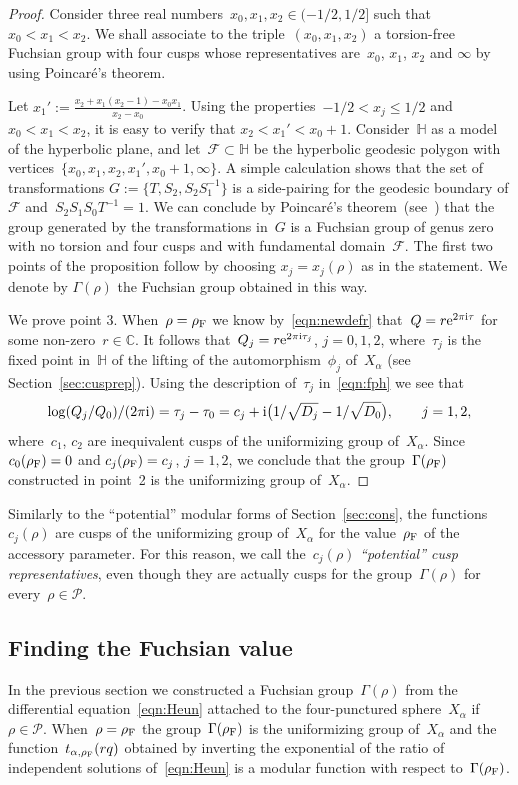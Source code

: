 \documentclass[pdftex]{sigma}
\newcommand{\C}{\mathbb{C}}
\newcommand{\Po}{\mathbb{H}}
\numberwithin{equation}{section}
\begin{document}
\begin{proof}Consider three real numbers~$x_0,x_1,x_2\in(-1/2,1/2]$ such that~$x_0<x_1<x_2$. We shall associate to the triple~$(x_0,x_1,x_2)$ a torsion-free Fuchsian group with four cusps whose representatives are~$x_0$, $x_1$, $x_2$ and $\infty$ by using Poincar\'e's theorem.

Let $x_1':=\frac{x_2+x_1(x_2-1)-x_0x_1}{x_2-x_0}$. Using the properties~$-1/2<x_j\le1/2$ and~$x_0<x_1<x_2$, it is easy to verify that $x_2<x_1'<x_0+1$.
Consider~$\Po$ as a model of the hyperbolic plane, and let~$\mathcal{F}\subset\Po$ be the hyperbolic geodesic polygon with vertices~$\{x_0,x_1,x_2,x_1',x_0+1,\infty\}$. A simple calculation shows that the set of transformations $G:=\big\{T,S_2,S_2S_1^{-1}\big\}$ is a side-pairing for the geodesic boundary of $\mathcal{F}$ and~$S_2S_1S_0T^{-1}=1$. We can conclude by Poincar\'e's theorem~(see~\cite{Beardon}) that the group generated by the transformations in~$G$ is a Fuchsian group of genus zero with no torsion and four cusps and with fundamental domain~$\mathcal{F}$.
The first two points of the proposition follow by choosing $x_j=x_j(\rho)$ as in the statement. We denote by $\Gamma(\rho)$ the Fuchsian group obtained in this way.

We prove point 3. When~$\rho=\rho_{\rm F}$ we know by~\eqref{eqn:newdefr} that~$Q=r{\rm e}^{2\pi {\rm i}\tau}$ for some non-zero~$r\in\C$.
It follows that~$Q_j=r{\rm e}^{2\pi {\rm i}\tau_j}$, $j=0,1,2$, where~$\tau_j$ is the fixed point in~$\Po$ of the lifting of the automorphism~$\phi_j$ of~$X_\alpha$ (see Section~\ref{sec:cusprep}). Using the description of~$\tau_j$ in~\eqref{eqn:fph} we see that
\[
\log(Q_j/Q_0)/(2\pi {\rm i}) = \tau_j -\tau_0 = {c}_j +{\rm i}\big(1/\sqrt{D_j}-1/\sqrt{D_0}\big),\qquad j=1,2,
\]
where~$c_1$, $c_2$ are inequivalent cusps of the uniformizing group of~$X_\alpha$. Since~$c_0(\rho_{\rm F})=0$ and $c_j(\rho_{\rm F})=c_j$, $j=1,2$, we conclude that the group~$\Gamma(\rho_{\rm F})$ constructed in point~2 is the uniformizing group of~$X_\alpha$.
\end{proof}

Similarly to the ``potential'' modular forms of Section~\ref{sec:cons}, the functions~$c_j(\rho)$ are cusps of the uniformizing group of~$X_\alpha$ for the value~$\rho_{\rm F}$ of the accessory parameter. For this reason, we call the~$c_j(\rho)$ \emph{``potential'' cusp representatives}, even though they are actually cusps for the group~$\Gamma(\rho)$ for every~$\rho\in\mathcal{P}$.

\subsection{Finding the Fuchsian value}\label{sec:findfin}
In the previous section we constructed a Fuchsian group~$\Gamma(\rho)$ from the differential equation~\eqref{eqn:Heun} attached to the four-punctured sphere~$X_\alpha$ if~$\rho\in\mathcal{P}$. When~$\rho=\rho_{\rm F}$ the group~$\Gamma(\rho_{\rm F})$ is the uniformizing group of~$X_\alpha$ and the function~$t_{\alpha,\rho_{\rm F}}(rq)$ obtained by inverting the exponential of the ratio of independent solutions of~\eqref{eqn:Heun} is a modular function with respect to~$\Gamma(\rho_{\rm F})$.
\end{document}
